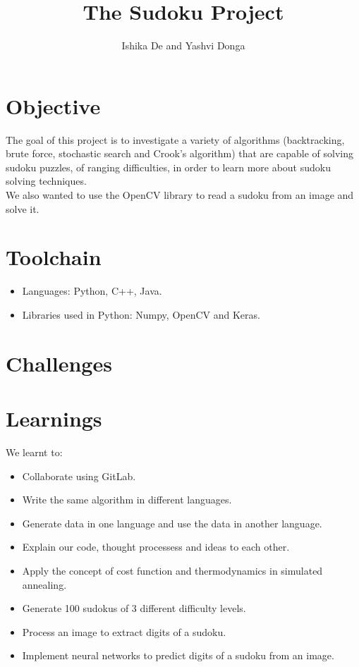 \documentclass{article}
\title{The Sudoku Project}
\author{Ishika De and Yashvi Donga}
\date{}
\begin{document}
    \maketitle
    \section{Objective}
    The goal of this project is to investigate a variety of algorithms
    (backtracking, brute force, stochastic search and Crook’s algorithm) that
    are capable of solving sudoku puzzles, of ranging difficulties, in order to
    learn more about sudoku solving techniques.\\
    We also wanted to use the OpenCV library to read a sudoku from an
    image and solve it.
    \section{Toolchain}
    \begin{itemize}
        \item Languages: Python, C++, Java.
        \item Libraries used in Python: Numpy, OpenCV and Keras.
    \end{itemize}
    \section{Challenges}
    \section{Learnings}
     We learnt to:
     \begin{itemize}
		 \item Collaborate using GitLab.
		 \item Write the same algorithm in different languages.
		 \item Generate data in one language and use the data in another language.
		 \item Explain our code, thought processess and ideas to each other.
		 \item Apply the concept of cost function and thermodynamics in simulated annealing.
		 \item Generate 100 sudokus of 3 different difficulty levels.
		 \item Process an image to extract digits of a sudoku.
		 \item Implement neural networks to predict digits of a sudoku from an image.
	 \end{itemize}
\end{document}
